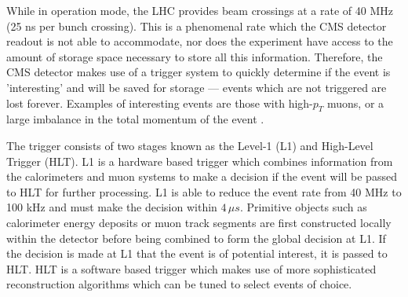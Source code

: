 While in operation mode, the LHC provides beam crossings at a rate of 40 MHz (25 ns per bunch crossing). This is a phenomenal rate which the CMS detector readout is not able to accommodate, nor does the experiment have access to the amount of storage space necessary to store all this information. Therefore, the CMS detector makes use of a trigger system to quickly determine if the event is 'interesting' and will be saved for storage --- events which are not triggered are lost forever. Examples of interesting events are those with high-$p_{T}$ muons, or a large imbalance in the total momentum of the event \cite{CMS-TRG-12-001}.

The trigger consists of two stages known as the Level-1 (L1) and High-Level Trigger (HLT). L1 is a hardware based trigger which combines information from the calorimeters and muon systems to make a decision if the event will be passed to HLT for further processing. L1 is able to reduce the event rate from 40 MHz to 100 kHz and must make the decision within $4\,\mu s$. Primitive objects such as calorimeter energy deposits or muon track segments are first constructed locally within the detector before being combined to form the global decision at L1. If the decision is made at L1 that the event is of potential interest, it is passed to HLT. HLT is a software based trigger which makes use of more sophisticated reconstruction algorithms which can be tuned to select events of choice.

